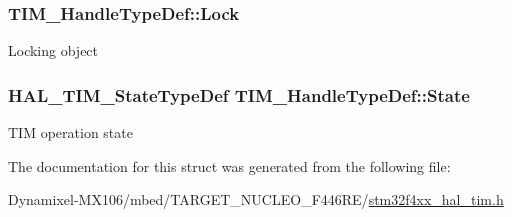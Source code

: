 \subsubsection[{\texorpdfstring{Lock}{Lock}}]{ T\+I\+M\+\_\+\+Handle\+Type\+Def\+::\+Lock}\hypertarget{struct_t_i_m___handle_type_def_a2a24b963b57150ed2fb0f051cd87b65a}{}\label{struct_t_i_m___handle_type_def_a2a24b963b57150ed2fb0f051cd87b65a}
Locking object 
\subsubsection[{\texorpdfstring{State}{State}}]{ {\bf H\+A\+L\+\_\+\+T\+I\+M\+\_\+\+State\+Type\+Def} T\+I\+M\+\_\+\+Handle\+Type\+Def\+::\+State}\hypertarget{struct_t_i_m___handle_type_def_a6b6eeaf94f2e6e3d0a5bdac44adf21d6}{}\label{struct_t_i_m___handle_type_def_a6b6eeaf94f2e6e3d0a5bdac44adf21d6}
T\+IM operation state 

The documentation for this struct was generated from the following file\+:\begin{DoxyCompactItemize}
\item 
Dynamixel-\/\+M\+X106/mbed/\+T\+A\+R\+G\+E\+T\+\_\+\+N\+U\+C\+L\+E\+O\+\_\+\+F446\+R\+E/\hyperlink{stm32f4xx__hal__tim_8h}{stm32f4xx\+\_\+hal\+\_\+tim.\+h}\end{DoxyCompactItemize}
